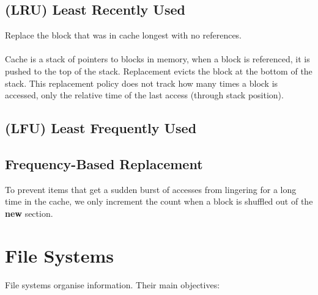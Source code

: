 \documentclass{report}
\begin{document}
        \subsection*{(LRU) Least Recently Used}
            Replace the block that was in cache longest with no references. 
            \\
            \\ Cache is a stack of pointers to blocks in memory, when a block is 
            referenced, it is pushed to the top of the stack. Replacement evicts 
            the block at the bottom of the stack.
            This replacement policy does not track how many times a block is accessed, 
            only the relative time of the last access (through stack position).
        \subsection*{(LFU) Least Frequently Used}
        
        \subsection*{Frequency-Based Replacement}
            To prevent items that get a sudden burst of accesses from lingering 
            for a long time in the cache, we only increment the count when a 
            block is shuffled out of the \textbf{new} section.
    
    \section*{File Systems}
        File systems organise information. Their main objectives:
\end{document}
